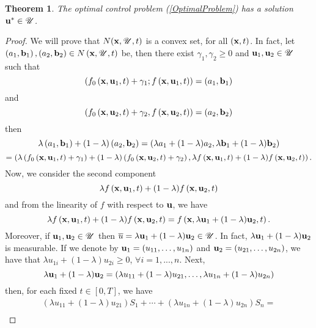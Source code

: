 \documentclass[a4paper,10pt]{article}
\newtheorem{thm}{Theorem}[section]
\theoremstyle{remark}
\begin{document}

\begin{thm}
The optimal control problem (\ref{OptimalProblem}) has a solution $\bold{u}^{*} \in \mathscr{U}$.
\end{thm}
\begin{proof}
We will prove that $N(\bold{x}, \mathscr{U}, t)$ is a convex set, for all $(\bold{x},t)$. In fact, let 
$\left(a_{1}, \bold{b}_{1}\right), \left(a_{2}, \bold{b}_{2}\right) \in N\left(\bold{x}, \mathscr{U}, t\right)$ be, then there exist $\gamma_{1}, \gamma_{2} \geq 0$ and $\bold{u}_{1}, \bold{u}_2 \in  \mathscr{U}$ such that 
$$
\left(f_{0}\left(\bold{x}, \bold{u}_{1}, t\right)+\gamma_{1} ; f\left(\bold{x}, \bold{u}_{1}, t\right)\right)=\left(a_{1}, \bold{b}_{1}\right) 
$$
and
$$
\left(f_{0}\left(\bold{x}, \bold{u}_{2}, t\right)+\gamma_{2}, f\left(\bold{x}, \bold{u}_{2}, t\right)\right)=\left(a_{2}, \bold{b}_{2}\right)
$$
then 
$$
\lambda\left(a_{1}, \bold{b}_{1}\right)+(1-\lambda)\left(a_{2}, \bold{b}_{2}\right)=\left(\lambda a_1+(1-\lambda) a_{2}, \lambda \bold{b}_{1}+(1-\lambda) \bold{b}_{2}\right)
$$
$$
=\left(\lambda\left(f_{0}\left(\bold{x}, \bold{u}_{1}, t\right)+\gamma_{1}\right)+(1-\lambda)\left(f_{0}\left(\bold{x}, \bold{u}_{2}, t\right)+\gamma_{2}\right), \lambda f\left(\bold{x}, \bold{u}_{1}, t\right)+(1-\lambda) f\left(\bold{x}, \bold{u}_{2}, t\right)\right).
$$
Now, we consider the second component
$$
\lambda f\left(\bold{x}, \bold{u}_{1}, t\right)+(1-\lambda) f\left(\bold{x}, \bold{u}_{2}, t\right)
$$
and from the linearity of $f$ with respect to $\bold{u}$, we have 
\[\lambda f\left(\bold{x}, \bold{u}_{1}, t\right)+(1-\lambda) f\left(\bold{x}, \bold{u}_{2}, t\right)=f\left(\bold{x}, \lambda  \bold{u}_{1}+(1-\lambda) \bold{u}_{2}, t\right).\]
Moreover, if $\bold{u}_1,\bold{u}_2\in \mathscr{U}$ then $\overline{u}=\lambda  \bold{u}_{1}+(1-\lambda) \bold{u}_{2} \in \mathscr{U}$. In fact, $\lambda \bold{u}_{1}+(1-\lambda) \bold{u}_{2}$ is measurable. If we denote by $ \bold{u}_{1}=\left( u_{11}, \ldots ,  u_{1 n}\right)$ and $ \bold{u}_{2}=\left( u_{21}, \ldots , u_{2 n}\right)$, we have that $\lambda  u_{1i}+(1-\lambda) u_{2i} \geqslant 0$, $\forall i=1, ...,n$. Next, \[
\lambda \bold{u}_{1}+(1-\lambda)  \bold{u}_{2}=\left(\lambda  u_{11}+(1-\lambda)  u_{21}, \ldots,\lambda  u_{1 n}+(1-\lambda)  u_{2 n}\right)
\]
then, for each fixed $t\in [0,T]$, we have
$$
\begin{array}{l}
\left(\lambda  u_{11}+(1-\lambda)  u_{21}\right)S_{1}+\cdots+\left(\lambda  u_{1n}+(1-\lambda)  u_{2n}\right)S_{n}=\\

\end{array}$$
\end{proof}
\end{document}
